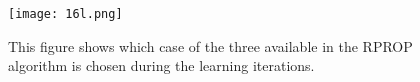 \begin{figure}[h!]
	\centering
	\texttt{[image: 16l.png]}
	\caption{This figure shows which case of the three available in the RPROP algorithm is chosen during the learning iterations.}
	\label{fig:app_multigrad}
\end{figure}












